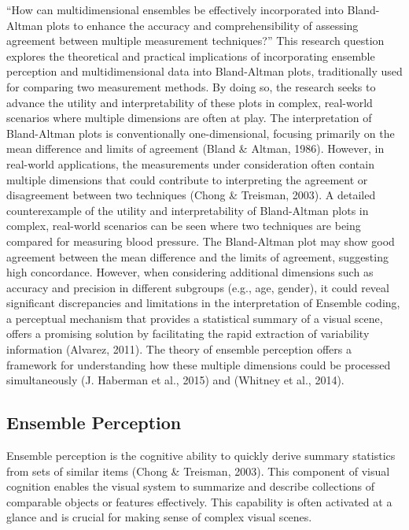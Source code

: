 \documentclass[print]{nuthesis}
\begin{document}
``How can multidimensional ensembles be effectively incorporated into Bland-Altman plots to enhance the accuracy and comprehensibility of assessing agreement between multiple measurement techniques?''
This research question explores the theoretical and practical implications of incorporating ensemble perception and multidimensional data into Bland-Altman plots, traditionally used for comparing two measurement methods.
By doing so, the research seeks to advance the utility and interpretability of these plots in complex, real-world scenarios where multiple dimensions are often at play.
The interpretation of Bland-Altman plots is conventionally one-dimensional, focusing primarily on the mean difference and limits of agreement (Bland \& Altman, 1986).
However, in real-world applications, the measurements under consideration often contain multiple dimensions that could contribute to interpreting the agreement or disagreement between two techniques (Chong \& Treisman, 2003).
A detailed counterexample of the utility and interpretability of Bland-Altman plots in complex, real-world scenarios can be seen where two techniques are being compared for measuring blood pressure.
The Bland-Altman plot may show good agreement between the mean difference and the limits of agreement, suggesting high concordance.
However, when considering additional dimensions such as accuracy and precision in different subgroups (e.g., age, gender), it could reveal significant discrepancies and limitations in the interpretation of Ensemble coding, a perceptual mechanism that provides a statistical summary of a visual scene, offers a promising solution by facilitating the rapid extraction of variability information (Alvarez, 2011).
The theory of ensemble perception offers a framework for understanding how these multiple dimensions could be processed simultaneously (J. Haberman et al., 2015) and (Whitney et al., 2014).

\hypertarget{ensemble-perception-1}{%
\subsection{Ensemble Perception}\label{ensemble-perception-1}}

Ensemble perception is the cognitive ability to quickly derive summary statistics from sets of similar items (Chong \& Treisman, 2003).
This component of visual cognition enables the visual system to summarize and describe collections of comparable objects or features effectively.
This capability is often activated at a glance and is crucial for making sense of complex visual scenes.
\end{document}
